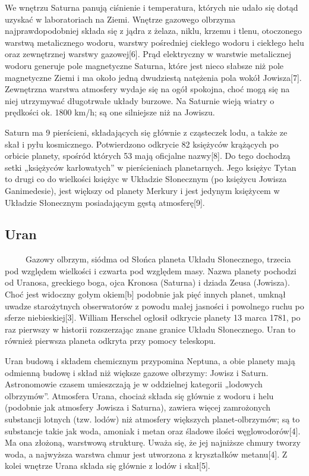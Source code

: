 \documentclass[12pt, letterpaper, titlepage]{article}
\begin{document}
We wnętrzu Saturna panują ciśnienie i temperatura, których nie udało się dotąd uzyskać w laboratoriach na Ziemi. Wnętrze gazowego olbrzyma najprawdopodobniej składa się z jądra z żelaza, niklu, krzemu i tlenu, otoczonego warstwą metalicznego wodoru, warstwy pośredniej ciekłego wodoru i ciekłego helu oraz zewnętrznej warstwy gazowej[6]. Prąd elektryczny w warstwie metalicznej wodoru generuje pole magnetyczne Saturna, które jest nieco słabsze niż pole magnetyczne Ziemi i ma około jedną dwudziestą natężenia pola wokół Jowisza[7]. Zewnętrzna warstwa atmosfery wydaje się na ogół spokojna, choć mogą się na niej utrzymywać długotrwałe układy burzowe. Na Saturnie wieją wiatry o prędkości ok. 1800 km/h; są one silniejsze niż na Jowiszu.

Saturn ma 9 pierścieni, składających się głównie z cząsteczek lodu, a także ze skał i pyłu kosmicznego. Potwierdzono odkrycie 82 księżyców krążących po orbicie planety, spośród których 53 mają oficjalne nazwy[8]. Do tego dochodzą setki „księżyców karłowatych” w pierścieniach planetarnych. Jego księżyc Tytan to drugi co do wielkości księżyc w Układzie Słonecznym (po księżycu Jowisza Ganimedesie), jest większy od planety Merkury i jest jedynym księżycem w Układzie Słonecznym posiadającym gęstą atmosferę[9].
\newpage
\subsection{Uran}
\ \ \ \ \ Gazowy olbrzym, siódma od Słońca planeta Układu Słonecznego, trzecia pod względem wielkości i czwarta pod względem masy. Nazwa planety pochodzi od Uranosa, greckiego boga, ojca Kronosa (Saturna) i dziada Zeusa (Jowisza). Choć jest widoczny gołym okiem[b] podobnie jak pięć innych planet, umknął uwadze starożytnych obserwatorów z powodu małej jasności i powolnego ruchu po sferze niebieskiej[3]. William Herschel ogłosił odkrycie planety 13 marca 1781, po raz pierwszy w historii rozszerzając znane granice Układu Słonecznego. Uran to również pierwsza planeta odkryta przy pomocy teleskopu.

Uran budową i składem chemicznym przypomina Neptuna, a obie planety mają odmienną budowę i skład niż większe gazowe olbrzymy: Jowisz i Saturn. Astronomowie czasem umieszczają je w oddzielnej kategorii „lodowych olbrzymów”. Atmosfera Urana, chociaż składa się głównie z wodoru i helu (podobnie jak atmosfery Jowisza i Saturna), zawiera więcej zamrożonych substancji lotnych (tzw. lodów) niż atmosfery większych planet-olbrzymów; są to substancje takie jak woda, amoniak i metan oraz śladowe ilości węglowodorów[4]. Ma ona złożoną, warstwową strukturę. Uważa się, że jej najniższe chmury tworzy woda, a najwyższa warstwa chmur jest utworzona z kryształków metanu[4]. Z kolei wnętrze Urana składa się głównie z lodów i skał[5].
\end{document}
